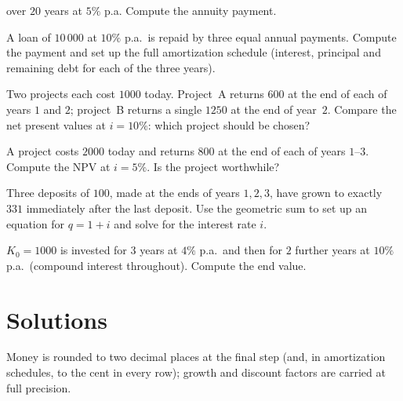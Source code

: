 \begin{problems}
        over $20$ years at $5\%$ p.a. Compute the annuity payment.
  \item A loan of $10\,000$ at $10\%$ p.a.\ is repaid by three equal
        annual payments. Compute the payment and set up the full
        amortization schedule (interest, principal and remaining debt
        for each of the three years).
  \item Two projects each cost $1000$ today. Project~A returns $600$ at
        the end of each of years $1$ and $2$; project~B returns a single
        $1250$ at the end of year~$2$. Compare the net present values at
        $i=10\%$: which project should be chosen?
  \item A project costs $2000$ today and returns $800$ at the end of
        each of years $1$--$3$. Compute the NPV at $i=5\%$. Is the
        project worthwhile?
  \item Three deposits of $100$, made at the ends of years $1,2,3$, have
        grown to exactly $331$ immediately after the last deposit. Use
        the geometric sum to set up an equation for $q=1+i$ and solve
        for the interest rate $i$.
  \item $K_{0}=1000$ is invested for $3$ years at $4\%$ p.a.\ and then
        for $2$ further years at $10\%$ p.a.\ (compound interest
        throughout). Compute the end value.
\end{problems}

\section{Solutions}

Money is rounded to two decimal places at the final step (and, in
amortization schedules, to the cent in every row); growth and discount
factors are carried at full precision.

